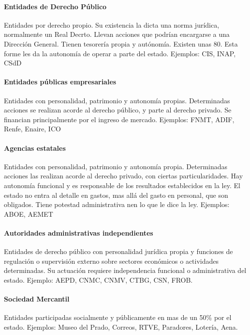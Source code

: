     \noindent{}

    \paragraph{Entidades de Derecho Público}
        Entidades por derecho propio. Su existencia la dicta una norma jurídica, normalmente un Real Decrto. Llevan acciones que podrían encargarse a una Dirección General. Tienen tesorería propia y autónomía. Existen unas 80. Esta forme les da la autonomía de operar a parte del estado. Ejemplos: CIS, INAP, CSdD

    \paragraph{Entidades públicas empresariales}
        Entidades con personalidad, patrimonio y autonomía propias. Determinadas acciones se realizan acorde al derecho público, y parte al derecho privado. Se financian principalmente por el ingreso de mercado. Ejemplos: FNMT, ADIF, Renfe, Enaire, ICO

    \paragraph{Agencias estatales}
        Entidades con personalidad, patrimonio y autonomía propia. Determinadas acciones las realizan acorde al derecho privado, con ciertas particularidades. Hay autonomía funcional y es responsable de los resultados establecidos en la ley. El estado no entra al detalle en gastos, mas allá del gasto en personal, que son obligados. Tiene potestad administrativa nen lo que le dice la ley. Ejemplos: ABOE, AEMET

    \paragraph{Autoridades administrativas independientes}
        Entidades de derecho público con personalidad jurídica propia y funciones de regulación o supervisión externo sobre sectores económicos o actividades determinadas. Su actuación requiere independencia funcional o administrativa del estado. Ejemplo: AEPD, CNMC, CNMV, CTBG, CSN, FROB.

    \paragraph{Sociedad Mercantil}
        Entidades participadas socialmente y públicamente en mas de un 50\% por el estado. Ejemplos: Museo del Prado, Correos, RTVE, Paradores, Lotería, Aena.

